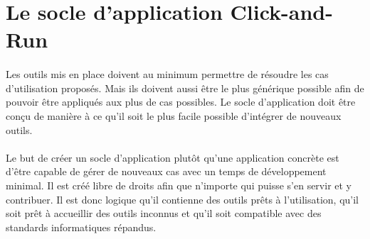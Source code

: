\section{Le socle d'application Click-and-Run}
\label{sec:spreadsheet-framework}

\paragraph{}
Les outils mis en place doivent au minimum permettre de résoudre les cas d'utilisation proposés.
Mais ils doivent aussi être le plus générique possible afin de pouvoir être appliqués aux plus de cas possibles.
Le socle d'application doit être conçu de manière à ce qu'il soit le plus facile possible d'intégrer de nouveaux outils.

\paragraph{}
Le but de créer un socle d'application plutôt qu'une application concrète est d'être capable de gérer de nouveaux cas avec un temps de développement minimal.
Il est créé libre de droits afin que n'importe qui puisse s'en servir et y contribuer.
Il est donc logique qu'il contienne des outils prêts à l'utilisation, qu'il soit prêt à accueillir des outils inconnus et qu'il soit compatible avec des standards informatiques répandus.








